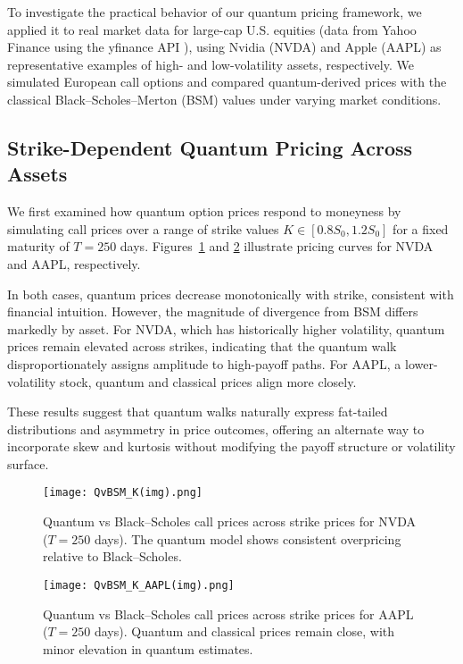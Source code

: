 \documentclass[11pt]{article}
\begin{document}
To investigate the practical behavior of our quantum pricing framework, we applied it to real market data for large-cap U.S. equities (data from Yahoo Finance using the yfinance API \cite{yfinance}), using Nvidia (NVDA) and Apple (AAPL) as representative examples of high- and low-volatility assets, respectively. We simulated European call options and compared quantum-derived prices with the classical Black--Scholes--Merton (BSM) values under varying market conditions.

\subsection{Strike-Dependent Quantum Pricing Across Assets}

We first examined how quantum option prices respond to moneyness by simulating call prices over a range of strike values $K \in [0.8S_0, 1.2S_0]$ for a fixed maturity of $T = 250$ days. Figures~\ref{fig:quantum_strike_sweep_nvda} and \ref{fig:quantum_strike_sweep_aapl} illustrate pricing curves for NVDA and AAPL, respectively.

In both cases, quantum prices decrease monotonically with strike, consistent with financial intuition. However, the magnitude of divergence from BSM differs markedly by asset. For NVDA, which has historically higher volatility, quantum prices remain elevated across strikes, indicating that the quantum walk disproportionately assigns amplitude to high-payoff paths. For AAPL, a lower-volatility stock, quantum and classical prices align more closely.

These results suggest that quantum walks naturally express fat-tailed distributions and asymmetry in price outcomes, offering an alternate way to incorporate skew and kurtosis without modifying the payoff structure or volatility surface.

\begin{figure}[H]
    \centering
    \texttt{[image: QvBSM\_K(img).png]}
    \caption{Quantum vs Black--Scholes call prices across strike prices for NVDA ($T = 250$ days). The quantum model shows consistent overpricing relative to Black--Scholes.}
    \label{fig:quantum_strike_sweep_nvda}
\end{figure}

\begin{figure}[H]
    \centering
    \texttt{[image: QvBSM\_K\_AAPL(img).png]}
    \caption{Quantum vs Black--Scholes call prices across strike prices for AAPL ($T = 250$ days). Quantum and classical prices remain close, with minor elevation in quantum estimates.}
    \label{fig:quantum_strike_sweep_aapl}
\end{figure}
\end{document}
